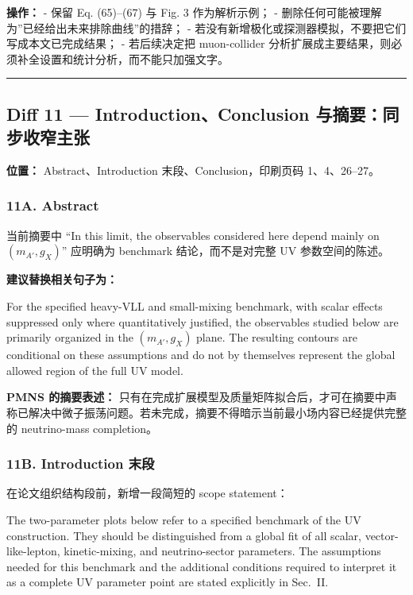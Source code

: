 \documentclass[
]{article}
\begin{document}
\textbf{操作：} - 保留 Eq. (65)--(67) 与 Fig. 3 作为解析示例； -
删除任何可能被理解为''已经给出未来排除曲线''的措辞； -
若没有新增极化或探测器模拟，不要把它们写成本文已完成结果； -
若后续决定把 muon-collider
分析扩展成主要结果，则必须补全设置和统计分析，而不能只加强文字。

\begin{center}\rule{0.5\linewidth}{0.5pt}\end{center}

\subsection{Diff 11 --- Introduction、Conclusion
与摘要：同步收窄主张}\label{diff-11-introductionconclusion-ux4e0eux6458ux8981ux540cux6b65ux6536ux7a84ux4e3bux5f20}

\textbf{位置：} Abstract、Introduction 末段、Conclusion，印刷页码
1、4、26--27。

\subsubsection{11A. Abstract}\label{a.-abstract}

当前摘要中 ``In this limit, the observables considered here depend
mainly on \((m_{A'},g_X)\)'' 应明确为 benchmark 结论，而不是对完整 UV
参数空间的陈述。

\textbf{建议替换相关句子为：}

For the specified heavy-VLL and small-mixing benchmark, with scalar
effects suppressed only where quantitatively justified, the observables
studied below are primarily organized in the
\((m_{A'},g_X)\) plane. The resulting contours are conditional
on these assumptions and do not by themselves represent the global
allowed region of the full UV model.

\textbf{PMNS 的摘要表述：}
只有在完成扩展模型及质量矩阵拟合后，才可在摘要中声称已解决中微子振荡问题。若未完成，摘要不得暗示当前最小场内容已经提供完整的
neutrino-mass completion。

\subsubsection{11B. Introduction
末段}\label{b.-introduction-ux672bux6bb5}

在论文组织结构段前，新增一段简短的 scope statement：

The two-parameter plots below refer to a specified benchmark of the
UV construction. They should be distinguished from a global fit of
all scalar, vector-like-lepton, kinetic-mixing, and neutrino-sector
parameters. The assumptions needed for this benchmark and the
additional conditions required to interpret it as a complete UV
parameter point are stated explicitly in Sec.~II.
\end{document}
